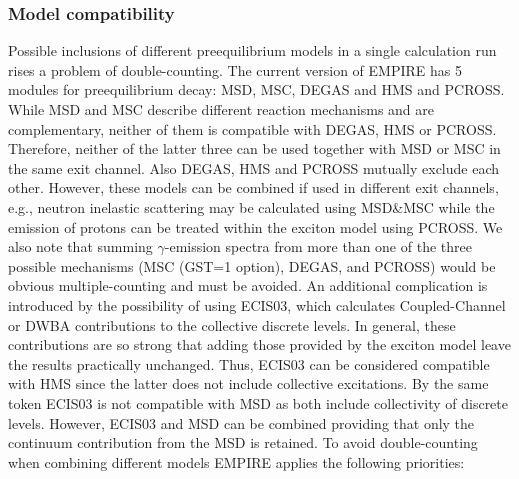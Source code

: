 \documentclass[twocolumn,amsmath,amssymb,10pt,groupedaddress,a4paper]{revtex4}
\begin{document}
\subsubsection{Model  compatibility }
Possible inclusions of different preequilibrium models in a single
calculation run rises a problem of double-counting. The current version
of EMPIRE has 5 modules for preequilibrium decay: MSD,
MSC, DEGAS and HMS and PCROSS.
While MSD and MSC describe different reaction mechanisms and are complementary,
neither of them is compatible with DEGAS, HMS or PCROSS. Therefore,
neither of the latter three can be used together with MSD or MSC in
the same exit channel. Also DEGAS, HMS and PCROSS mutually exclude
each other. However, these models can be combined if used in different
exit channels, e.g., neutron inelastic scattering may be calculated
using MSD\&MSC while the emission of protons can be treated within
the exciton model using PCROSS. We also note that summing $\gamma$-emission
spectra from more than one of the three possible mechanisms (MSC
(GST=1 option), DEGAS, and PCROSS) would be obvious
multiple-counting and must be avoided.
An additional complication is introduced by the possibility of using
ECIS03, which calculates Coupled-Channel
or DWBA contributions to the collective discrete levels. In general, these
contributions are so strong that adding those provided by the exciton
model leave the results practically unchanged. Thus, ECIS03 can be
considered compatible with HMS since the latter does not include
collective excitations. By the same token ECIS03 is not
compatible with MSD as both include collectivity of discrete
levels. However, ECIS03 and MSD can be combined providing that only
the continuum contribution from the MSD is retained.
To avoid double-counting when combining different models EMPIRE applies
the following priorities:
\end{document}

